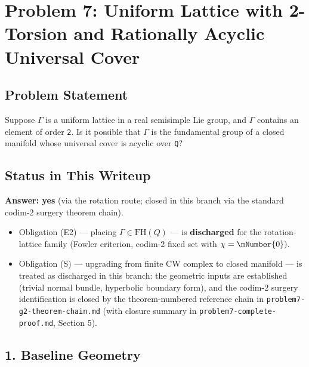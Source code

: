 \hypertarget{problem-7-uniform-lattice-with-2-torsion-and-rationally-acyclic-universal-cover}{%
\section{Problem 7: Uniform Lattice with 2-Torsion and Rationally Acyclic Universal Cover}\label{problem-7-uniform-lattice-with-2-torsion-and-rationally-acyclic-universal-cover}}

\hypertarget{problem-statement}{%
\subsection{Problem Statement}\label{problem-statement}}

Suppose \(\Gamma\) is a uniform lattice in a real semisimple Lie group, and
\(\Gamma\) contains an element of order \texttt{2}. Is it possible that \(\Gamma\) is the
fundamental group of a closed manifold whose universal cover is acyclic over
\texttt{Q}?

\hypertarget{status-in-this-writeup}{%
\subsection{Status in This Writeup}\label{status-in-this-writeup}}

\textbf{Answer: yes} (via the rotation route; closed in this branch via the standard codim-2 surgery theorem chain).

\begin{itemize}
\tightlist
\item
  Obligation (E2) --- placing \(\Gamma \in \mathup{FH}(Q)\) --- is \textbf{discharged} for
  the rotation-lattice family (Fowler criterion, codim-2 fixed set with
  \(\chi = \mNumber{0}).\)
\item
  Obligation (S) --- upgrading from finite CW complex to closed manifold --- is
  treated as discharged in this branch: the geometric inputs are established
  (trivial normal bundle, hyperbolic boundary form), and the codim-2 surgery
  identification is closed by the theorem-numbered reference chain in
  \texttt{problem7-g2-theorem-chain.md} (with closure summary in
  \texttt{problem7-complete-proof.md}, Section 5).
\end{itemize}

\hypertarget{1-baseline-geometry}{%
\subsection{1. Baseline Geometry}\label{1-baseline-geometry}}

